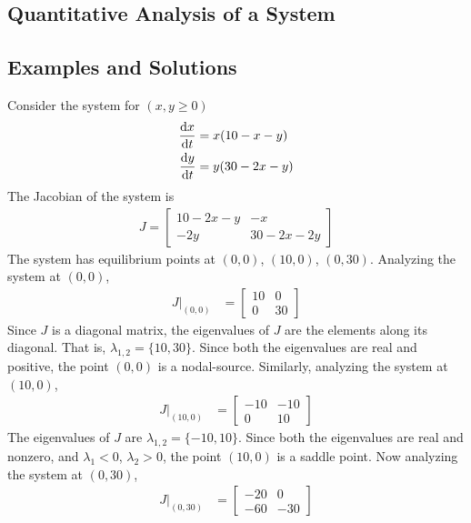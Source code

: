 \documentclass[12pt,1in]{article}
\newenvironment{Example}[2][Example]{\begin{trivlist}
		\item[\hskip \labelsep {\bfseries #1}\hskip \labelsep {\bfseries #2.}]}{\end{trivlist}}
\begin{document}
\subsection{Quantitative Analysis of a System}

\subsection{Examples and Solutions}
\begin{Example}{1} \cite[p.~488]{diff_eq}
	Consider the system for $(x,y \geq 0)$
	\begin{align*}
    \derivative{x}{t} &= x(10 - x - y) \\
    \derivative{y}{t} &= y(30 - 2x - y)
\end{align*}
The Jacobian of the system is 
\begin{align*}
    J = \begin{bmatrix}
    10 - 2x - y & -x \\
    -2y & 30 - 2x - 2y
    \end{bmatrix}
\end{align*}
The system has equilibrium points at $(0,0)$, $(10,0)$, $(0,30)$. Analyzing the system at $(0,0)$,
\begin{align*}
    J|_{(0,0)} &= \begin{bmatrix}
    10 & 0 \\
    0 & 30
    \end{bmatrix}
\end{align*}
Since $J$ is a diagonal matrix, the eigenvalues of $J$ are the elements along its diagonal. That is, $\lambda_{1,2} = \{ 10, 30 \}$. Since both the eigenvalues are real and positive, the point $(0,0)$ is a nodal-source.
Similarly, analyzing the system at $(10,0)$,
\begin{align*}
    J|_{(10,0)} &= 
    \begin{bmatrix}
    -10 & -10\\
    0 & 10 
    \end{bmatrix}
\end{align*}
The eigenvalues of $J$ are $\lambda_{1,2} = \{-10, 10\}$. Since both the eigenvalues are real and nonzero, and $\lambda_1 < 0$, $\lambda_2 > 0$, the point $(10,0)$ is a saddle point. 
Now analyzing the system at $(0,30)$,
\begin{align*}
J|_{(0,30)} &= \begin{bmatrix}
-20 & 0 \\
-60 & -30 
\end{bmatrix}
\end{align*}

\end{Example}
\end{document}
